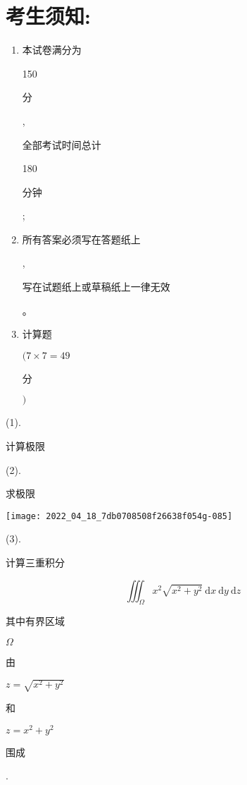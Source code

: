 \documentclass[10pt]{article}
\begin{document}
\section{考生须知:}
\begin{enumerate}
  \item \begin{CJK}{UTF8}{mj}本试卷满分为\end{CJK} 150 \begin{CJK}{UTF8}{mj}分\end{CJK}, \begin{CJK}{UTF8}{mj}全部考试时间总计\end{CJK} 180 \begin{CJK}{UTF8}{mj}分钟\end{CJK};

  \item \begin{CJK}{UTF8}{mj}所有答案必须写在答题纸上\end{CJK}, \begin{CJK}{UTF8}{mj}写在试题纸上或草稿纸上一律无效\end{CJK}。

  \item \begin{CJK}{UTF8}{mj}计算题\end{CJK} $(7 \times 7=49$ \begin{CJK}{UTF8}{mj}分\end{CJK} $)$

\end{enumerate}
(1). \begin{CJK}{UTF8}{mj}计算极限\end{CJK}

(2). \begin{CJK}{UTF8}{mj}求极限\end{CJK}

\texttt{[image: 2022\_04\_18\_7db0708508f26638f054g-085]}

(3). \begin{CJK}{UTF8}{mj}计算三重积分\end{CJK}
$$
\iiint_{\Omega} x^{2} \sqrt{x^{2}+y^{2}} \mathrm{~d} x \mathrm{~d} y \mathrm{~d} z
$$
\begin{CJK}{UTF8}{mj}其中有界区域\end{CJK} $\Omega$ \begin{CJK}{UTF8}{mj}由\end{CJK} $z=\sqrt{x^{2}+y^{2}}$ \begin{CJK}{UTF8}{mj}和\end{CJK} $z=x^{2}+y^{2}$ \begin{CJK}{UTF8}{mj}围成\end{CJK}.
\end{document}
